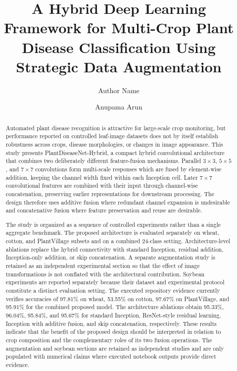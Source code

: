 \documentclass[a4paper,fleqn]{cas-dc}
\begin{document}
\let\WriteBookmarks\relax
{}
\title[mode=title]{A Hybrid Deep Learning Framework for Multi-Crop Plant Disease Classification Using Strategic Data Augmentation}
\author[1]{Author Name}
\author[1]{Anupama Arun}

\begin{abstract}
Automated plant disease recognition is attractive for large-scale crop monitoring, but performance reported on controlled leaf-image datasets does not by itself establish robustness across crops, disease morphologies, or changes in image appearance. This study presents PlantDiseaseNet-Hybrid, a compact hybrid convolutional architecture that combines two deliberately different feature-fusion mechanisms. Parallel $3\times3$, $5\times5$, and $7\times7$ convolutions form multi-scale responses which are fused by element-wise addition, keeping the channel width fixed within each Inception cell. Later $7\times7$ convolutional features are combined with their input through channel-wise concatenation, preserving earlier representations for downstream processing. The design therefore uses additive fusion where redundant channel expansion is undesirable and concatenative fusion where feature preservation and reuse are desirable.

The study is organized as a sequence of controlled experiments rather than a single aggregate benchmark. The proposed architecture is evaluated separately on wheat, cotton, and PlantVillage subsets and on a combined 24-class setting. Architecture-level ablations replace the hybrid connectivity with standard Inception, residual addition, Inception-only addition, or skip concatenation. A separate augmentation study is retained as an independent experimental section so that the effect of image transformations is not conflated with the architectural contribution. Soybean experiments are reported separately because their dataset and experimental protocol constitute a distinct evaluation setting. The executed repository evidence currently verifies accuracies of 97.81\% on wheat, 53.55\% on cotton, 97.67\% on PlantVillage, and 95.91\% for the combined proposed model. The architecture ablations obtain 95.33\%, 96.04\%, 95.84\%, and 95.67\% for standard Inception, ResNet-style residual learning, Inception with additive fusion, and skip concatenation, respectively. These results indicate that the benefit of the proposed design should be interpreted in relation to crop composition and the complementary roles of its two fusion operations. The augmentation and soybean sections are retained as independent studies and are only populated with numerical claims where executed notebook outputs provide direct evidence.
\end{abstract}
\end{document}
